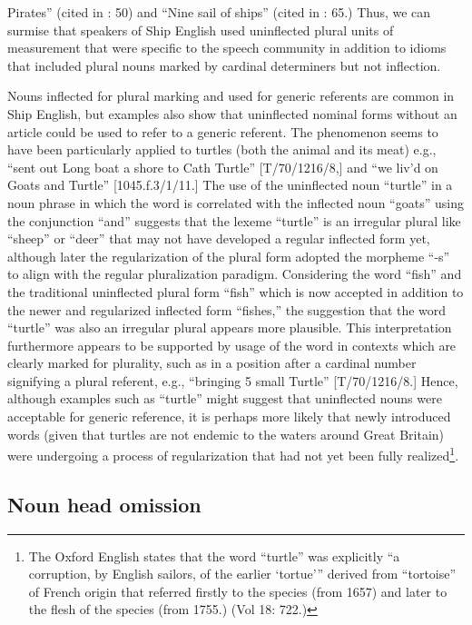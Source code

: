 Pirates” (cited in \citealt{Palmer1986}: 50) and “Nine sail of ships” (cited in \citealt{Palmer1986}: 65.) Thus, we can surmise that speakers of Ship English used uninflected plural units of measurement that were specific to the speech community in addition to idioms that included plural nouns marked by cardinal determiners but not inflection. 

Nouns inflected for plural marking and used for generic referents are common in Ship English, but examples also show that uninflected nominal forms without an article could be used to refer to a generic referent. The phenomenon seems to have been particularly applied to turtles (both the animal and its meat) e.g., “sent out Long boat a shore to Cath Turtle” [T/70/1216/8,] and “we liv’d on Goats and Turtle” [1045.f.3/1/11.] The use of the uninflected noun “turtle” in a noun phrase in which the word is correlated with the inflected noun “goats” using the conjunction “and” suggests that the lexeme “turtle” is an irregular plural like “sheep” or “deer” that may not have developed a regular inflected form yet, although later the regularization of the plural form adopted the morpheme “-s” to align with the regular pluralization paradigm. Considering the word “fish” and the traditional uninflected plural form “fish” which is now accepted in addition to the newer and regularized inflected form “fishes,” the suggestion that the word “turtle” was also an irregular plural appears more plausible. This interpretation furthermore appears to be supported by usage of the word in contexts which are clearly marked for plurality, such as in a position after a cardinal number signifying a plural referent, e.g., “bringing 5 small Turtle” [T/70/1216/8.] Hence, although examples such as “turtle” might suggest that uninflected nouns were acceptable for generic reference, it is perhaps more likely that newly introduced words (given that turtles are not endemic to the waters around Great Britain) were undergoing a process of regularization that had not yet been fully realized\footnote{The Oxford English \citet{Dictionary1989} states that the word “turtle” was explicitly “a corruption, by English sailors, of the earlier ‘tortue’” derived from “tortoise” of French origin that referred firstly to the species (from 1657) and later to the flesh of the species (from 1755.) (Vol 18: 722.)}. 

\subsection{{Noun} {head} {omission} }%

